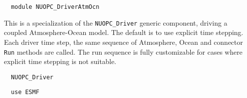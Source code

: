  
\setlength{\parskip}{0pt}
\setlength{\parindent}{0pt}
\setlength{\baselineskip}{11pt}
 
\def\bv{\begin{verbatim}}
\def\ev{\end{verbatim}}
\def\be{\begin{equation}}
\def\ee{\end{equation}}
\def\bea{\begin{eqnarray}}
\def\eea{\end{eqnarray}}
\def\bi{\begin{itemize}}
\def\ei{\end{itemize}}
\def\bn{\begin{enumerate}}
\def\en{\end{enumerate}}
\def\bd{\begin{description}}
\def\ed{\end{description}}
\def\({\left (}
\def\){\right )}
\def\[{\left [}
\def\]{\right ]}
\def\<{\left  \langle}
\def\>{\right \rangle}
\def\cI{{\cal I}}
\def\diag{\mathop{\rm diag}}
\def\tr{\mathop{\rm tr}}


\begin{verbatim}  module NUOPC_DriverAtmOcn
\end{verbatim}

This is a specialization of the {\tt NUOPC\_Driver} generic component, driving a coupled Atmosphere-Ocean model. The default is to use explicit time stepping. Each driver time step, the same sequence of Atmosphere, Ocean and connector {\tt Run} methods are called. The run sequence is fully customizable for cases where explicit time stepping is not suitable.

\begin{verbatim}  NUOPC_Driver
\end{verbatim}

\begin{verbatim}  use ESMF
\end{verbatim}

